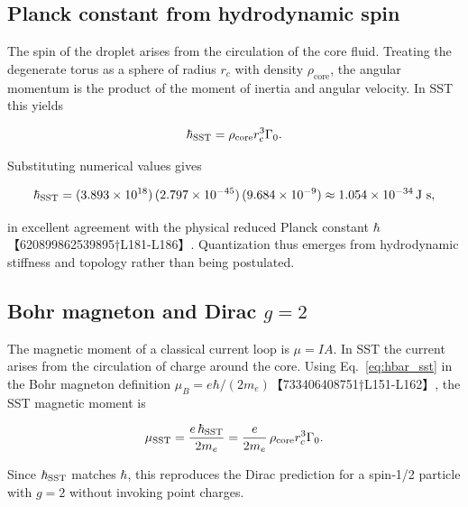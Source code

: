 \documentclass[11pt]{article}
\newcommand{\rc}{r_c}                                    %
\newcommand{\rhocore}{\rho_{\text{core}}}
\newcommand{\GammaSST}{\Gamma_0}
\begin{document}
\subsection{Planck constant from hydrodynamic spin}


The spin of the droplet arises from the circulation of the core fluid.  Treating the degenerate torus as a sphere of radius $\rc$ with density $\rhocore$, the angular momentum is the product of the moment of inertia and angular velocity.  In SST this yields


\begin{equation}


    \hbar_{\rm SST} = \rhocore \rc^3 \GammaSST.


    \label{eq:hbar_sst}


\end{equation}


Substituting numerical values gives


\begin{equation}


    \hbar_{\rm SST} = (3.893\times 10^{18})\,(2.797\times 10^{-45})\,(9.684\times 10^{-9}) \approx 1.054\times 10^{-34}\,\text{J s},


\end{equation}


in excellent agreement with the physical reduced Planck constant $\hbar$【620899862539895†L181-L186】.  Quantization thus emerges from hydrodynamic stiffness and topology rather than being postulated.






\subsection{Bohr magneton and Dirac $g=2$}


The magnetic moment of a classical current loop is $\mu = I A$.  In SST the current arises from the circulation of charge around the core.  Using Eq.~\eqref{eq:hbar_sst} in the Bohr magneton definition $\mu_B = e\hbar/(2m_e)$【733406408751†L151-L162】, the SST magnetic moment is


\begin{equation}


    \mu_{\rm SST} = \frac{e\,\hbar_{\rm SST}}{2 m_e} = \frac{e}{2 m_e}\,\rhocore \rc^3 \GammaSST.


\end{equation}


Since $\hbar_{\rm SST}$ matches $\hbar$, this reproduces the Dirac prediction for a spin‑1/2 particle with $g=2$ without invoking point charges.
\end{document}
